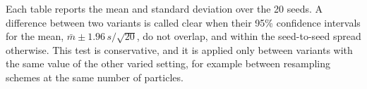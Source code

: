 Each table reports the mean and standard deviation over the 20 seeds. A difference between two variants is called
clear when their 95\% confidence intervals for the mean, $\bar{m} \pm 1.96\, s / \sqrt{20}$, do not overlap, and within
the seed-to-seed spread otherwise. This test is conservative, and it is applied only between variants with the same
value of the other varied setting, for example between resampling schemes at the same number of particles.
